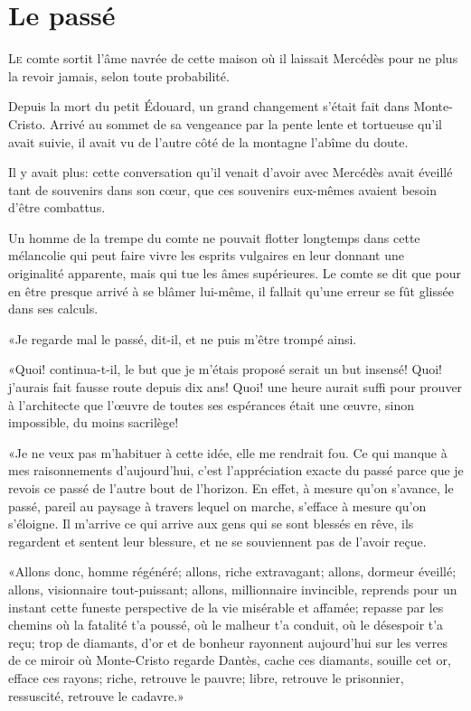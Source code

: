 \chapter{Le passé}

\lettrine{L}{e} comte sortit l'âme navrée de cette maison où il laissait Mercédès pour ne plus la revoir jamais, selon toute probabilité. 

\zz
Depuis la mort du petit Édouard, un grand changement s'était fait dans Monte-Cristo. Arrivé au sommet de sa vengeance par la pente lente et tortueuse qu'il avait suivie, il avait vu de l'autre côté de la montagne l'abîme du doute. 

Il y avait plus: cette conversation qu'il venait d'avoir avec Mercédès avait éveillé tant de souvenirs dans son cœur, que ces souvenirs eux-mêmes avaient besoin d'être combattus. 

Un homme de la trempe du comte ne pouvait flotter longtemps dans cette mélancolie qui peut faire vivre les esprits vulgaires en leur donnant une originalité apparente, mais qui tue les âmes supérieures. Le comte se dit que pour en être presque arrivé à se blâmer lui-même, il fallait qu'une erreur se fût glissée dans ses calculs. 

«Je regarde mal le passé, dit-il, et ne puis m'être trompé ainsi. 

«Quoi! continua-t-il, le but que je m'étais proposé serait un but insensé! Quoi! j'aurais fait fausse route depuis dix ans! Quoi! une heure aurait suffi pour prouver à l'architecte que l'œuvre de toutes ses espérances était une œuvre, sinon impossible, du moins sacrilège! 

«Je ne veux pas m'habituer à cette idée, elle me rendrait fou. Ce qui manque à mes raisonnements d'aujourd'hui, c'est l'appréciation exacte du passé parce que je revois ce passé de l'autre bout de l'horizon. En effet, à mesure qu'on s'avance, le passé, pareil au paysage à travers lequel on marche, s'efface à mesure qu'on s'éloigne. Il m'arrive ce qui arrive aux gens qui se sont blessés en rêve, ils regardent et sentent leur blessure, et ne se souviennent pas de l'avoir reçue. 

«Allons donc, homme régénéré; allons, riche extravagant; allons, dormeur éveillé; allons, visionnaire tout-puissant; allons, millionnaire invincible, reprends pour un instant cette funeste perspective de la vie misérable et affamée; repasse par les chemins où la fatalité t'a poussé, où le malheur t'a conduit, où le désespoir t'a reçu; trop de diamants, d'or et de bonheur rayonnent aujourd'hui sur les verres de ce miroir où Monte-Cristo regarde Dantès, cache ces diamants, souille cet or, efface ces rayons; riche, retrouve le pauvre; libre, retrouve le prisonnier, ressuscité, retrouve le cadavre.» 

